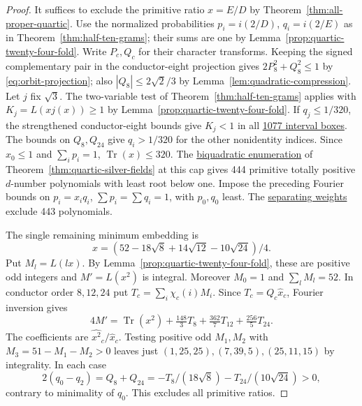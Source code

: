 \documentclass[11pt,reqno]{amsart}
\newcommand{\codecheck}[2]{\href{https://github.com/sebastienpalcoux/grothendieck-ring-classification/blob/d5750105bb5758f3ad38d2e5464dfcc12c019816/supplements/rank6/sphericality/#1}{#2}}
\theoremstyle{remark}\newtheorem{remark}[theorem]{Remark}
\numberwithin{equation}{section}
\begin{document}
\begin{proof}
It suffices to exclude the primitive ratio $x=E/D$ by
Theorem~\ref{thm:all-proper-quartic}. Use the normalized probabilities
$p_i=i(2/D)$, $q_i=i(2/E)$ as in Theorem~\ref{thm:half-ten-grams};
their sums are one by Lemma~\ref{prop:quartic-twenty-four-fold}.
Write $P_c,Q_c$ for their character transforms. Keeping the signed
complementary pair in the conductor-eight projection gives
$2P_8^2+Q_8^2\le1$ by \eqref{eq:orbit-projection}; also
$|Q_8|\le2\sqrt2/3$ by Lemma~\ref{lem:quadratic-compression}.
Let $j$ fix $\sqrt3$. The two-variable test of
Theorem~\ref{thm:half-ten-grams} applies with
$K_j=L(xj(x))\ge1$ by Lemma~\ref{prop:quartic-twenty-four-fold}.
If $q_j\le1/320$, the strengthened conductor-eight bounds give
$K_j<1$ in all \codecheck{generic_quartic/short24/height.py}{1077 interval boxes}.
The bounds on $Q_8,Q_{24}$ give $q_i>1/320$ for the other
nonidentity indices. Since $x_0\le1$ and $\sum_i p_i=1$,
$\operatorname{Tr}(x)\le320$.
The \codecheck{generic_quartic/short24/verify.py}{biquadratic enumeration}
of Theorem~\ref{thm:quartic-silver-fields} at this cap gives
444 primitive totally positive $d$-number polynomials with least
root below one. Impose the preceding Fourier bounds on
$p_i=x_iq_i$, $\sum p_i=\sum q_i=1$, with $p_0,q_0$ least.
The \codecheck{generic_quartic/short24/short24_duals.json}{separating weights}
exclude 443 polynomials.

The single remaining minimum embedding is
\[
 x=(52-18\sqrt8+14\sqrt{12}-10\sqrt{24})/4.
\]
Put $M_l=L(lx)$. By Lemma~\ref{prop:quartic-twenty-four-fold},
these are positive odd integers and $M'=L(x^2)$ is integral.
Moreover $M_0=1$ and $\sum_l M_l=52$.
In conductor order $8,12,24$ put
$T_c=\sum_i\chi_c(i)M_i$. Since $T_c=Q_c\widehat x_c$,
Fourier inversion gives
\[
 4M'=\operatorname{Tr}(x^2)+\tfrac{148}{3}T_8+
             \tfrac{362}{7}T_{12}+\tfrac{256}{5}T_{24}.
\]
The coefficients are $\widehat{x^2}_c/\widehat x_c$. Testing
positive odd $M_1,M_2$ with $M_3=51-M_1-M_2>0$ leaves just
$(1,25,25),(7,39,5),(25,11,15)$ by integrality. In each case
\[
 2(q_0-q_2)=Q_8+Q_{24}
   =-T_8/(18\sqrt8)-T_{24}/(10\sqrt{24})>0,
\]
contrary to minimality of $q_0$. This excludes all primitive ratios.
\end{proof}
\end{document}
